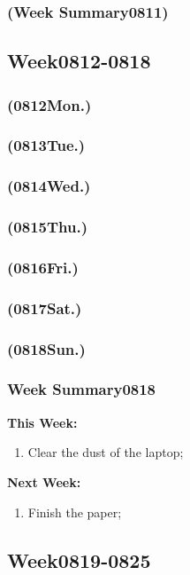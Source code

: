 \subsubsection{(Week Summary0811)}	 
\subsection{Week0812-0818} 
\subsubsection{(0812Mon.)}
\subsubsection{(0813Tue.)}
\subsubsection{(0814Wed.)}
\subsubsection{(0815Thu.)}
\subsubsection{(0816Fri.)}
\subsubsection{(0817Sat.)}
\subsubsection{(0818Sun.)}
\subsubsection{Week Summary0818}	 
{\setlength{\parindent}{0pt}\textbf{This Week:}}
\begin{enumerate}
	\item Clear the dust of the laptop;
\end{enumerate}
\textbf{Next Week:}
\begin{enumerate}
	\item Finish the paper;	
\end{enumerate}
\subsection{Week0819-0825} 
